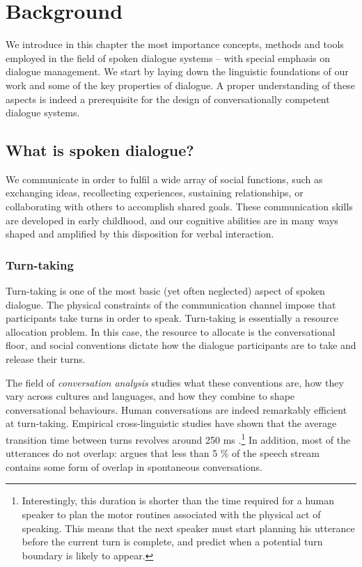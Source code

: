 
\chapter{Background}
\label{chap:background}

We introduce in this chapter the most importance concepts, methods and tools employed in the field of spoken dialogue systems -- with special emphasis on dialogue management.  We start by laying down the linguistic foundations of our work and some of the key properties of dialogue.  A proper understanding of these aspects is indeed a prerequisite for the design of conversationally competent dialogue systems.

\section{What is spoken dialogue?}

We communicate in order to fulfil a wide array of social functions, such as exchanging ideas, recollecting experiences,  sustaining relationships, or collaborating with others to accomplish shared goals. These communication skills are developed in early childhood, and our cognitive abilities are in many ways shaped and amplified by this disposition for verbal interaction.  


\subsection{Turn-taking}

Turn-taking is one of the most basic (yet often neglected) aspect of spoken dialogue. The physical constraints of the communication channel impose that participants take turns in order to speak.   Turn-taking is essentially a resource allocation problem.  In this case, the resource to allocate is the conversational floor, and social conventions dictate how the dialogue participants are to take and release their turns. 

The field of  \textit{conversation analysis} studies what these conventions are, how they vary across cultures and languages, and how they combine to shape conversational behaviours. Human conversations are indeed remarkably efficient at turn-taking.  Empirical cross-linguistic studies have shown that the average transition time between turns revolves around 250 ms \citep{Stivers30062009}.\footnote{Interestingly, this duration is shorter than the time required for a human speaker to plan the motor routines associated with the physical act of speaking.  This means that the next speaker must start planning his utterance before the current turn is complete, and predict when a potential turn boundary is likely to appear.} In addition, most of the utterances do not overlap: \cite{Levinson1983} argues that less than 5 \% of the speech stream contains some form of overlap in spontaneous conversations.  

